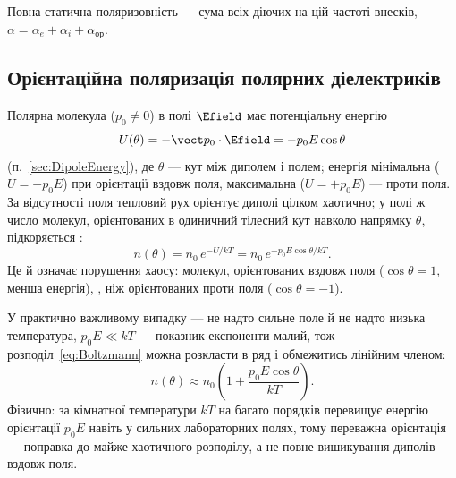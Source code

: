 Повна статична поляризовність --- сума всіх діючих на цій частоті внесків, $\alpha = \alpha_e + \alpha_i + \alpha_\text{ор}$.


\subsection*{Орієнтаційна поляризація полярних діелектриків}\label{sec:Langevin-Debye}

Полярна молекула ($p_0\neq0$) в полі $\Efield$ має потенціальну енергію
\begin{equation*}
	U(\theta) = -\vect p_0\cdot\Efield = -p_0 E\cos\theta
\end{equation*}
(п.~\ref{sec:DipoleEnergy}), де $\theta$ --- кут між диполем і полем; енергія мінімальна ($U=-p_0E$) при орієнтації вздовж поля, максимальна
($U=+p_0E$) --- проти поля. За відсутності поля тепловий рух орієнтує диполі цілком хаотично; у полі ж число молекул, орієнтованих в одиничний
тілесний кут навколо напрямку $\theta$, підкоряється :
\begin{equation}\label{eq:Boltzmann}
	n(\theta) = n_0\, e^{-U/kT} = n_0\, e^{+p_0 E\cos\theta / kT}.
\end{equation}
Це й означає порушення хаосу: молекул, орієнтованих вздовж поля ($\cos\theta=1$, менша енергія), , ніж орієнтованих
проти поля ($\cos\theta=-1$).

У практично важливому випадку --- не надто сильне поле й не надто низька температура, $p_0E \ll kT$ --- показник експоненти малий, тож
розподіл~\eqref{eq:Boltzmann} можна розкласти в ряд і обмежитись лінійним членом:
\begin{equation}\label{eq:BoltzmannLinear}
	n(\theta) \approx n_0\left(1 + \frac{p_0 E \cos\theta}{kT}\right).
\end{equation}
Фізично: за кімнатної температури $kT$ на багато порядків перевищує енергію орієнтації $p_0E$ навіть у сильних лабораторних полях, тому переважна
орієнтація ---  поправка до майже хаотичного розподілу, а не повне вишикування диполів вздовж поля.

